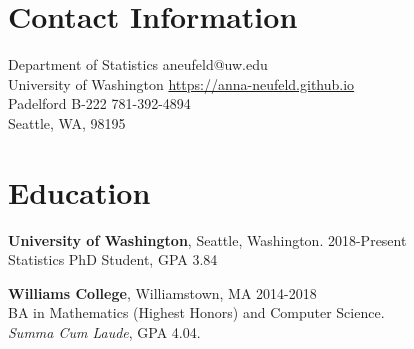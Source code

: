 \documentclass[margin, 10pt]{res} %
\begin{document}
\begin{resume}

 

\section{Contact Information}
Department of Statistics \hfill  aneufeld@uw.edu\\
University of Washington \hfill \href{https://anna-neufeld.github.io}{https://anna-neufeld.github.io} \\
Padelford B-222  \hfill 781-392-4894 \\
Seattle, WA, 98195



\section{Education} 

{\textbf{University of Washington},} Seattle, Washington. \hfill 2018-Present \\
Statistics PhD Student, GPA 3.84 

{\textbf{Williams College}}, Williamstown, MA \hfill 2014-2018  \\
BA in Mathematics (Highest Honors) and Computer Science. \\ 
\textit{Summa Cum Laude}, GPA 4.04. 
 

\end{resume}
\end{document}
